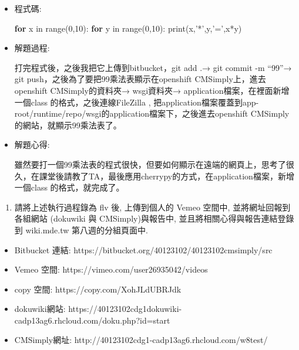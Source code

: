 \documentclass[]{article}
\newenvironment{Shaded}{}{}
\newcommand{\KeywordTok}[1]{\textcolor[rgb]{0.00,0.44,0.13}{\textbf{{#1}}}}
\newcommand{\DataTypeTok}[1]{\textcolor[rgb]{0.56,0.13,0.00}{{#1}}}
\newcommand{\DecValTok}[1]{\textcolor[rgb]{0.25,0.63,0.44}{{#1}}}
\newcommand{\StringTok}[1]{\textcolor[rgb]{0.25,0.44,0.63}{{#1}}}
\newcommand{\NormalTok}[1]{{#1}}
\begin{document}
\begin{itemize}
\item
  程式碼:

\begin{Shaded}
\begin{Highlighting}[]
    \KeywordTok{for} \NormalTok{x in }\DataTypeTok{range}\NormalTok{(}\DecValTok{0}\NormalTok{,}\DecValTok{10}\NormalTok{):}
        \KeywordTok{for} \NormalTok{y in }\DataTypeTok{range}\NormalTok{(}\DecValTok{0}\NormalTok{,}\DecValTok{10}\NormalTok{):}
            \DataTypeTok{print}\NormalTok{(x,}\StringTok{'*'}\NormalTok{,y,}\StringTok{'='}\NormalTok{,x*y)}
\end{Highlighting}
\end{Shaded}
\item
  解題過程:

  打完程式後，之後我把它上傳到bitbucket，git add .→ git commit -m
  ``99''→ git push，之後為了要把99乘法表顯示在openshift
  CMSimply上，進去openshift CMSimply的資料夾→ wsgi資料夾→
  application檔案，在裡面新增一個class 的格式，之後連線FileZilla ,
  把application檔案覆蓋到app-root/runtime/repo/wsgi的application檔案下，之後進去openshift
  CMSimply的網站，就顯示99乘法表了。
\item
  解題心得:

  雖然要打一個99乘法表的程式很快，但要如何顯示在遠端的網頁上，思考了很久，在課堂後請教了TA，最後應用cherrypy的方式，在application檔案，新增一個class
  的格式，就完成了。
\end{itemize}

\begin{enumerate}
\def\labelenumi{\arabic{enumi}.}
\setcounter{enumi}{1}
\itemsep1pt\parskip0pt
\item
  請將上述執行過程錄為 flv 後, 上傳到個人的 Vemeo 空間中,
  並將網址回報到各組網站 (dokuwiki 與 CMSimply)與報告中,
  並且將相關心得與報告連結登錄到 wiki.mde.tw 第八週的分組頁面中.
\end{enumerate}

\begin{itemize}
\item
  Bitbucket 連結: https://bitbucket.org/40123102/40123102cmsimply/src
\item
  Vemeo 空間: https://vimeo.com/user26935042/videos
\item
  copy 空間: https://copy.com/XohJLdUBRJdk
\item
  dokuwiki網站:
  https://40123102cdg1dokuwiki-cadp13ag6.rhcloud.com/doku.php?id=start
\item
  CMSimply網址: http://40123102cdg1-cadp13ag6.rhcloud.com/w8test/
\end{itemize}
\end{document}
